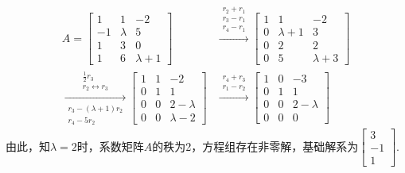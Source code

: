 \begin{align*}
A= \begin{bmatrix}1&1&-2\\-1&\lambda&5\\1&3&0\\1&6&\lambda+1\end{bmatrix} &
   \xrightarrow{\begin{matrix}r_2+r_1\\r_3-r_1\\r_4-r_1\end{matrix}}
   \begin{bmatrix}1&1&-2\\0&\lambda+1&3\\0&2&2\\0&5&\lambda+3\end{bmatrix} \\
   \xrightarrow[\begin{matrix}r_3-(\lambda+1)r_2\\r_4-5r_2\end{matrix}]
   {\begin{matrix}\frac{1}{2}r_3\\r_2\leftrightarrow r_3\end{matrix}}
   \begin{bmatrix}1&1&-2\\0&1&1\\0&0&2-\lambda\\0&0&\lambda-2\end{bmatrix} &
   \xrightarrow{\begin{matrix}r_4+r_3\\r_1-r_2\end{matrix}}
   \begin{bmatrix}1&0&-3\\0&1&1\\0&0&2-\lambda\\0&0&0\end{bmatrix}
\end{align*}
由此，知$\lambda=2$时，系数矩阵$A$的秩为2，方程组存在非零解，基础解系为$\begin{bmatrix}3\\-1\\1\end{bmatrix}$.\\
